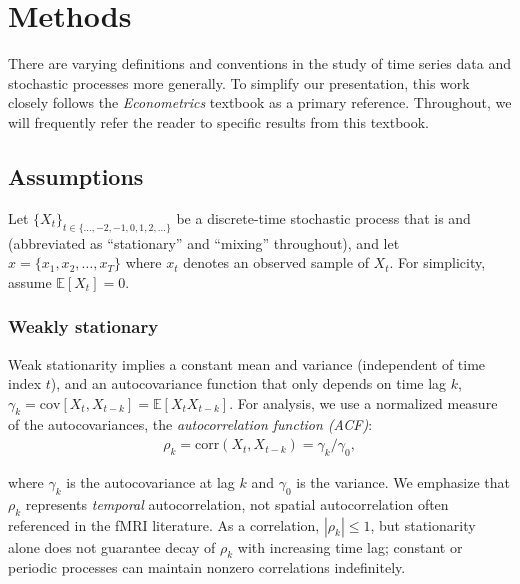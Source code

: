 \documentclass[docs/main.tex]{subfiles}
\begin{document}
\section{Methods}\label{sec:methods}

There are varying definitions and conventions in the study of time series data and stochastic processes more generally. To simplify our presentation, this work closely follows the \citet{hansen_econometrics_2022} \emph{Econometrics} textbook as a primary reference. Throughout, we will frequently refer the reader to specific results from this textbook.

\subsection{Assumptions} \label{sec:assumptions}

Let $\{X_t\}_{t\in\{\dots, -2, -1, 0, 1, 2, \dots\}}$ be a discrete-time stochastic process that is  and  (abbreviated as ``stationary'' and ``mixing'' throughout), and let $x = \{x_1, x_2, \dots, x_T\}$ where $x_t$ denotes an observed sample of $X_t$. For simplicity, assume $\mathbb{E}[X_t] = 0$. 

\subsubsection{Weakly stationary} \label{sec:weak-stationarity}
Weak stationarity implies a constant mean and variance (independent of time index $t$), and an autocovariance function that only depends on time lag $k$, $\gamma_k = \text{cov}[X_t, X_{t-k}] =\mathbb{E}[X_t X_{t-k}]$. For analysis, we use a normalized measure of the autocovariances, the \textit{autocorrelation function (ACF)}:
\begin{align} \label{eq:acf}
\rho_k = \text{corr}(X_t, X_{t-k}) = \gamma_k/\gamma_0,
\end{align}

\noindent where $\gamma_k$ is the autocovariance at lag $k$ and $\gamma_0$ is the variance. We emphasize that $\rho_k$ represents \textit{temporal} autocorrelation, not spatial autocorrelation often referenced in the fMRI literature. As a correlation, $|\rho_k|\le 1$, but stationarity alone does not guarantee decay of $\rho_k$ with increasing time lag; constant or periodic processes can maintain nonzero correlations indefinitely. 
\end{document}
